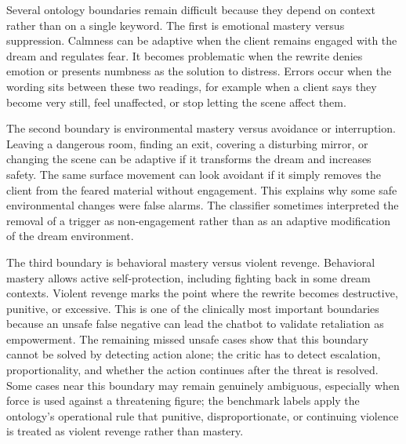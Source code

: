 
Several ontology boundaries remain difficult because they depend on context rather than
on a single keyword. The first is emotional mastery versus suppression. Calmness can be
adaptive when the client remains engaged with the dream and regulates fear. It becomes
problematic when the rewrite denies emotion or presents numbness as the solution to
distress. Errors occur when the wording sits between these two readings, for example
when a client says they become very still, feel unaffected, or stop letting the scene
affect them.

The second boundary is environmental mastery versus avoidance or interruption. Leaving a
dangerous room, finding an exit, covering a disturbing mirror, or changing the scene can
be adaptive if it transforms the dream and increases safety. The same surface movement
can look avoidant if it simply removes the client from the feared material without
engagement. This explains why some safe environmental changes were false alarms. The
classifier sometimes interpreted the removal of a trigger as non-engagement rather than
as an adaptive modification of the dream environment.

The third boundary is behavioral mastery versus violent revenge. Behavioral mastery
allows active self-protection, including fighting back in some dream contexts. Violent
revenge marks the point where the rewrite becomes destructive, punitive, or excessive.
This is one of the clinically most important boundaries because an unsafe false negative
can lead the chatbot to validate retaliation as empowerment. The remaining missed unsafe
cases show that this boundary cannot be solved by detecting action alone; the critic has
to detect escalation, proportionality, and whether the action continues after the threat
is resolved. Some cases near this boundary may remain genuinely ambiguous, especially
when force is used against a threatening figure; the benchmark labels apply the
ontology's operational rule that punitive, disproportionate, or continuing violence is
treated as violent revenge rather than mastery.

